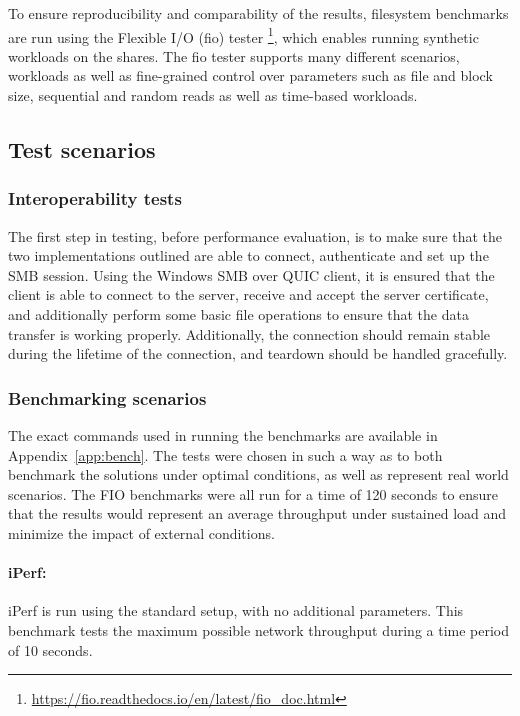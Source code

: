 \documentclass[english, 12pt, a4paper, elec, utf8, a-2b, online]{aaltothesis}
\begin{document}
To ensure reproducibility and comparability of the results, filesystem benchmarks are run
using the Flexible I/O (fio) tester \footnote{\url{https://fio.readthedocs.io/en/latest/fio_doc.html}},
which enables running synthetic workloads on the shares. The fio tester supports
many different scenarios, workloads as well as fine-grained control over parameters
such as file and block size, sequential and random reads as well as time-based workloads.

\subsection{Test scenarios}

\subsubsection{Interoperability tests}

The first step in testing, before performance evaluation, is to make sure that
the two implementations outlined are able to connect, authenticate and set up
the SMB session. Using the Windows SMB over QUIC client, it is ensured that the client
is able to connect to the server, receive and accept the server certificate, and
additionally perform some basic file operations to ensure that the data transfer is
working properly. Additionally, the connection should remain stable during the lifetime
of the connection, and teardown should be handled gracefully.

\subsubsection{Benchmarking scenarios}

The exact commands used in running the benchmarks are available in Appendix~\ref{app:bench}.
The tests were chosen in such a way as to both benchmark the solutions under optimal conditions,
as well as represent real world scenarios. The FIO benchmarks were all run for a time of
120 seconds to ensure that the results would represent an average throughput under sustained
load and minimize the impact of external conditions.

\paragraph{iPerf:}
iPerf is run using the standard setup, with no additional parameters. This benchmark tests
the maximum possible network throughput during a time period of 10 seconds.
\end{document}
